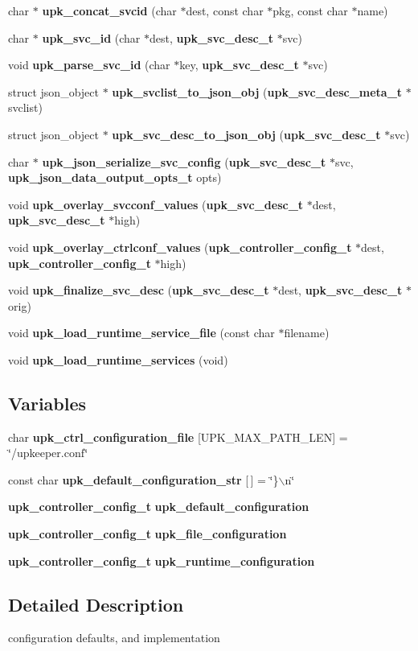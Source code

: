 \begin{DoxyCompactItemize}
\item 
char $\ast$ {\bf upk\_\-concat\_\-svcid} (char $\ast$dest, const char $\ast$pkg, const char $\ast$name)
\item 
char $\ast$ {\bf upk\_\-svc\_\-id} (char $\ast$dest, {\bf upk\_\-svc\_\-desc\_\-t} $\ast$svc)
\item 
void {\bf upk\_\-parse\_\-svc\_\-id} (char $\ast$key, {\bf upk\_\-svc\_\-desc\_\-t} $\ast$svc)
\item 
struct json\_\-object $\ast$ {\bf upk\_\-svclist\_\-to\_\-json\_\-obj} ({\bf upk\_\-svc\_\-desc\_\-meta\_\-t} $\ast$svclist)
\item 
struct json\_\-object $\ast$ {\bf upk\_\-svc\_\-desc\_\-to\_\-json\_\-obj} ({\bf upk\_\-svc\_\-desc\_\-t} $\ast$svc)
\item 
char $\ast$ {\bf upk\_\-json\_\-serialize\_\-svc\_\-config} ({\bf upk\_\-svc\_\-desc\_\-t} $\ast$svc, {\bf upk\_\-json\_\-data\_\-output\_\-opts\_\-t} opts)
\item 
void {\bf upk\_\-overlay\_\-svcconf\_\-values} ({\bf upk\_\-svc\_\-desc\_\-t} $\ast$dest, {\bf upk\_\-svc\_\-desc\_\-t} $\ast$high)
\item 
void {\bf upk\_\-overlay\_\-ctrlconf\_\-values} ({\bf upk\_\-controller\_\-config\_\-t} $\ast$dest, {\bf upk\_\-controller\_\-config\_\-t} $\ast$high)
\item 
void {\bf upk\_\-finalize\_\-svc\_\-desc} ({\bf upk\_\-svc\_\-desc\_\-t} $\ast$dest, {\bf upk\_\-svc\_\-desc\_\-t} $\ast$orig)
\item 
void {\bf upk\_\-load\_\-runtime\_\-service\_\-file} (const char $\ast$filename)
\item 
void {\bf upk\_\-load\_\-runtime\_\-services} (void)
\end{DoxyCompactItemize}
\subsection*{Variables}
\begin{DoxyCompactItemize}
\item 
char {\bf upk\_\-ctrl\_\-configuration\_\-file} [UPK\_\-MAX\_\-PATH\_\-LEN] = \char`\"{}/upkeeper.conf\char`\"{}
\item 
const char {\bf upk\_\-default\_\-configuration\_\-str} [$\,$] = \char`\"{}\}$\backslash$n\char`\"{}
\item 
{\bf upk\_\-controller\_\-config\_\-t} {\bf upk\_\-default\_\-configuration}
\item 
{\bf upk\_\-controller\_\-config\_\-t} {\bf upk\_\-file\_\-configuration}
\item 
{\bf upk\_\-controller\_\-config\_\-t} {\bf upk\_\-runtime\_\-configuration}
\end{DoxyCompactItemize}


\subsection{Detailed Description}
configuration defaults, and implementation 